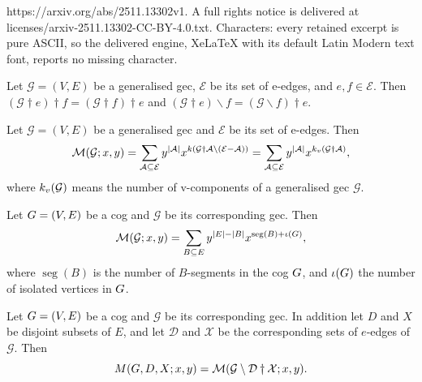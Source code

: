 \documentclass[10pt,a4paper]{amsart}
\DeclareMathOperator{\seg}{seg}
\newcommand{\ba}{\mathbin{\backslash}}
\newcommand{\calM}{\mathcal{M}}
\newcommand{\cog}[1]{\textbf{\textit #1}}
\newcommand{\ext}{\mathbin{\dagger}}
\newcommand{\gec}[1]{\mathcal{#1}}
\begin{document}
https://arxiv.org/abs/2511.13302v1. A full rights notice is delivered at licenses/arxiv-2511.13302-CC-BY-4.0.txt. Characters: every retained excerpt is pure ASCII, so the delivered engine, XeLaTeX with its default Latin Modern text font, reports no missing character.
\begin{proposition}\label{prop:2dag}
Let $\gec{G}=(V,E)$ be a generalised gec,  $\mathcal{E}$ be its set of e-edges, and $e,f\in \mathcal{E}$. Then 
$(\gec{G}\ext e)\ext f = (\gec{G}\ext f)\ext e$ and 
$(\gec{G}\ext e)\ba f = (\gec{G}\ba f)\ext e$. 
\end{proposition}

\begin{theorem}\label{thm:mwd}
Let $\gec{G}=(V,E)$ be a generalised gec and $\mathcal{E}$ be its set of e-edges. Then
\[
\calM(\gec{G};x,y) 
= \sum_{\mathcal{A} \subseteq \mathcal{E}} y^{|\mathcal{A}|}x^{k(\gec{G}\ext \mathcal{A} \setminus (\mathcal{E}-\mathcal{A}))}
= \sum_{\mathcal{A} \subseteq \mathcal{E}} y^{|\mathcal{A}|}x^{k_{\textup{v}}(\gec{G}\ext \mathcal{A} )},
\]
where $k_{\textup{v}}(\gec{G})$ means the number of v-components of a generalised gec $\gec{G}$.
\end{theorem}

\begin{theorem}\label{thm:rda}
Let $\cog{G}=(V,E)$ be a cog and $\gec{G}$ be its corresponding gec. Then
\[
 \calM(\gec{G};x, y) = \sum_{B\subseteq E}   y^{|E|-|B|} x^{\seg(B)+\iota(\cog{G})}, 
 \]
where $\seg(B)$ is the number of $B$-segments in the cog $\cog{G}$, and $\iota(\cog{G})$ the number of isolated vertices in $\cog{G}$.
\end{theorem}

\begin{theorem}\label{thm:scg}
Let $\cog{G}=(V,E)$ be a cog and $\gec{G}$ be its corresponding gec. In addition let $D$ and $X$ be disjoint subsets of $E$, and let $\gec{D}$ and $\gec{X}$ be the corresponding sets of $e$-edges of $\gec{G}$.  Then
\[ M(\cog{G},D,X;x, y) =  \calM(\gec{G}\ba \gec{D}\ext \gec{X}  ; x,y).\]
\end{theorem}
\end{document}
